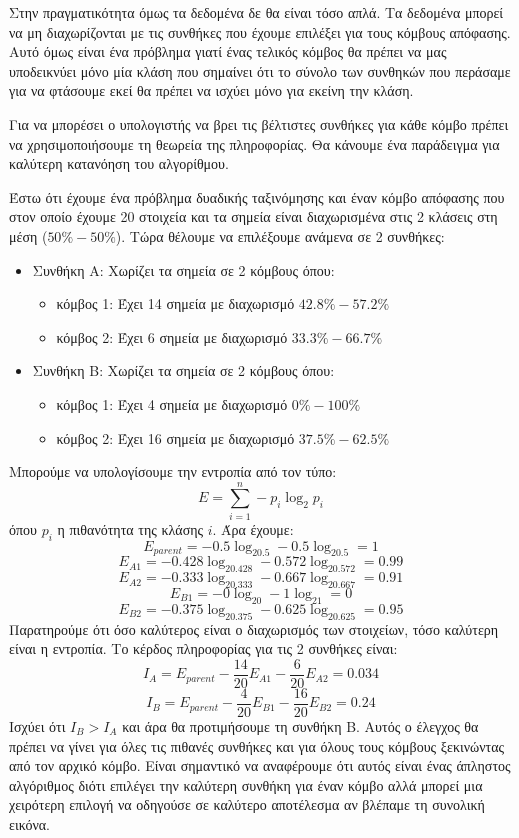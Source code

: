 Στην πραγματικότητα όμως τα δεδομένα δε θα είναι τόσο απλά. Τα δεδομένα μπορεί να μη διαχωρίζονται
με τις συνθήκες που έχουμε επιλέξει για τους κόμβους απόφασης. Αυτό όμως είναι ένα πρόβλημα γιατί
ένας τελικός κόμβος θα πρέπει να μας υποδεικνύει μόνο μία κλάση που σημαίνει ότι το σύνολο των
συνθηκών που περάσαμε για να φτάσουμε εκεί θα πρέπει να ισχύει μόνο για εκείνη την κλάση.

Για να μπορέσει ο υπολογιστής να βρει τις βέλτιστες συνθήκες για κάθε κόμβο πρέπει να
χρησιμοποιήσουμε τη θεωρεία της πληροφορίας. Θα κάνουμε ένα παράδειγμα για καλύτερη κατανόηση
του αλγορίθμου.

Έστω ότι έχουμε ένα πρόβλημα δυαδικής ταξινόμησης και έναν κόμβο απόφασης που στον οποίο έχουμε
20 στοιχεία και τα σημεία είναι διαχωρισμένα στις 2 κλάσεις στη μέση ($50\%-50\%$). Τώρα θέλουμε να
επιλέξουμε ανάμενα σε 2 συνθήκες:
\begin{itemize}
    \item Συνθήκη Α: Χωρίζει τα σημεία σε 2 κόμβους όπου:
    \begin{itemize}
        \item κόμβος 1: Έχει 14 σημεία με διαχωρισμό $42.8\%-57.2\%$
        \item κόμβος 2: Έχει 6 σημεία με διαχωρισμό $33.3\%-66.7\%$
    \end{itemize}
    \item Συνθήκη Β: Χωρίζει τα σημεία σε 2 κόμβους όπου:
    \begin{itemize}
        \item κόμβος 1: Έχει 4 σημεία με διαχωρισμό $0\%-100\%$
        \item κόμβος 2: Έχει 16 σημεία με διαχωρισμό $37.5\%-62.5\%$
    \end{itemize}
\end{itemize}
Μπορούμε να υπολογίσουμε την εντροπία από τον τύπο:
$$E=\sum\limits_{i=1}^{n}-p_i\log_2p_i$$
όπου $p_i$ η πιθανότητα της κλάσης $i$. Άρα έχουμε:
$$E_{parent}=-0.5\log_20.5-0.5\log_20.5=1$$
$$E_{A1}=-0.428\log_20.428-0.572\log_20.572=0.99$$
$$E_{A2}=-0.333\log_20.333-0.667\log_20.667=0.91$$
$$E_{B1}=-0\log_20-1\log_21=0$$
$$E_{B2}=-0.375\log_20.375-0.625\log_20.625=0.95$$
Παρατηρούμε ότι όσο καλύτερος είναι ο διαχωρισμός των στοιχείων, τόσο καλύτερη είναι η εντροπία.
Το κέρδος πληροφορίας για τις 2 συνθήκες είναι:
$$I_A=E_{parent}-\frac{14}{20}E_{A1}-\frac{6}{20}E_{A2}=0.034$$
$$I_B=E_{parent}-\frac{4}{20}E_{B1}-\frac{16}{20}E_{B2}=0.24$$
Ισχύει ότι $I_B>I_A$ και άρα θα προτιμήσουμε τη συνθήκη Β. Αυτός ο έλεγχος θα πρέπει να γίνει για
όλες τις πιθανές συνθήκες και για όλους τους κόμβους ξεκινώντας από τον αρχικό κόμβο. Είναι
σημαντικό να αναφέρουμε ότι αυτός είναι ένας άπληστος αλγόριθμος διότι επιλέγει την καλύτερη
συνθήκη για έναν κόμβο αλλά μπορεί μια χειρότερη επιλογή να οδηγούσε σε καλύτερο αποτέλεσμα αν
βλέπαμε τη συνολική εικόνα.
